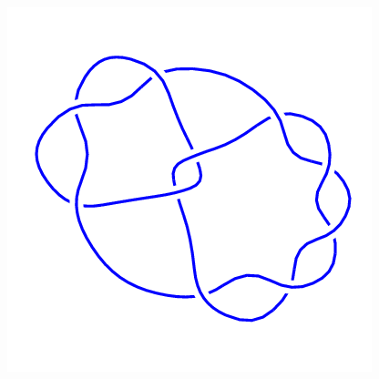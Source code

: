 \begin{figure}[H]
\begin{minipage}[b]{.18\linewidth}
	\end{minipage}
	\begin{minipage}[b]{.18\linewidth}
		\centering
		\includegraphics[width=\linewidth]{../data/10_46.png}
	\end{minipage}
\end{figure}
